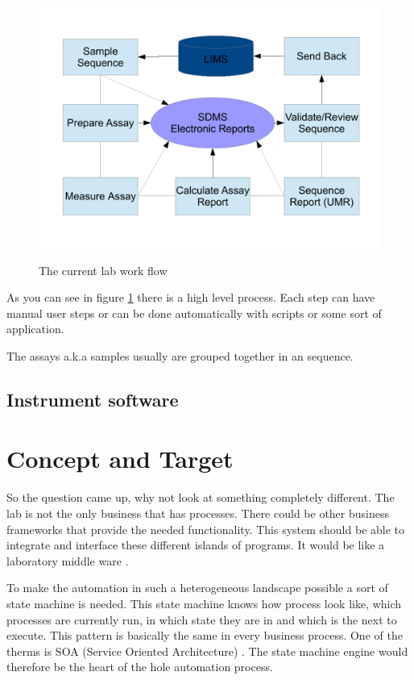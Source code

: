 \documentclass[paper=a4,twoside=false,BCOR=0mm,DIV=calc,fontsize=12pt]{scrartcl}
\begin{document}
\begin{figure}
    \begin{center}
      \includegraphics[width=1\textwidth]{./img/Laboverview.pdf}\\
    \end{center}
  \caption{The current lab work flow}
  \label{CurrentLabWorkflow}
\end{figure} 

As you can see in figure \ref{CurrentLabWorkflow} there is a high level process. Each step can have manual user steps or can be done automatically with scripts or some sort of application. 

The assays a.k.a samples usually are grouped together in an sequence.

\subsection{Instrument software}


\section{Concept and Target}
So the question came up, why not look at something completely different. The lab is not the only business that has processes. There could be other business frameworks that provide the needed functionality. This system should be able to integrate and interface these different islands of programs. It would be like a laboratory middle ware \cite{middleware}. 

To make the automation in such a heterogeneous landscape possible a sort of state machine is needed. This state machine knows how process look like, which processes are currently run, in which state they are in and which is the next to execute.
This pattern is basically the same in every business process. One of the therms is SOA (Service Oriented Architecture) \cite{soa}. The state machine engine would therefore be the heart of the hole automation process.
\end{document}
